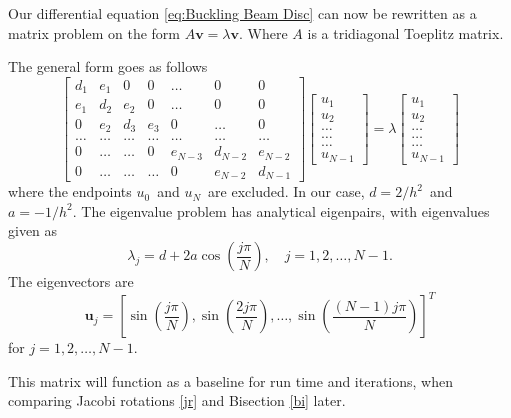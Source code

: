 \documentclass[%
reprint,
nofootinbib,
amsmath,amssymb,
aps,
]{revtex4-1}
\begin{document}
Our differential equation \ref{eq:Buckling Beam Disc} can now be rewritten as a matrix problem on the form $A\mathbf{v} = \lambda \mathbf{v}$. 
Where $A$ is a tridiagonal Toeplitz matrix. 

The general form goes as follows 
\begin{equation}\label{TriToe}
	\begin{bmatrix}
		d_1 & e_1 & 0 & 0 & \dots & 0 & 0\\
		e_1 & d_2 & e_2 & 0 & \dots & 0 & 0 \\
		0 &e_2 & d_3 & e_3 & 0 & \dots & 0\\
		\dots&\dots&\dots&\dots&\dots&\dots&\dots\\
		0 & \dots & \dots & 0 & e_{N-3} & d_{N-2} &e_{N-2}\\
		0 & \dots & \dots & \dots & 0 & e_{N-2} & d_{N-1}
	\end{bmatrix}
	\begin{bmatrix}
		u_1\\
		u_2\\
		\dots\\
		\dots\\
		\dots\\
		u_{N-1}
	\end{bmatrix}
	= \lambda 
	\begin{bmatrix}
		u_1\\
		u_2\\
		\dots\\
		\dots\\
		\dots\\
		u_{N-1}
	\end{bmatrix}
\end{equation}
where the endpoints $u_0$ and $u_N$ are excluded. In our case, $d = 2/h^2$ and $a = -1/h^2$. The eigenvalue problem has analytical eigenpairs\cite{tomLyche}, with eigenvalues given as 
\begin{equation}
	\lambda_j = d + 2a\cos\left(\frac{j\pi}{N}\right), \quad j = 1,2,\dots, N-1.
\end{equation}
The eigenvectors are 
\begin{equation}
	\mathbf{u}_j = \left[\sin\left(\frac{j\pi}{N}\right),\sin\left(\frac{2j\pi}{N}\right),\dots,\sin\left(\frac{(N-1)j\pi}{N}\right)\right]^T
\end{equation}
for $j=1,2,\dots,N-1$.

This matrix will function as a baseline for run time and iterations, when comparing Jacobi rotations \ref{jr} and Bisection \ref{bi} later. 
\end{document}
